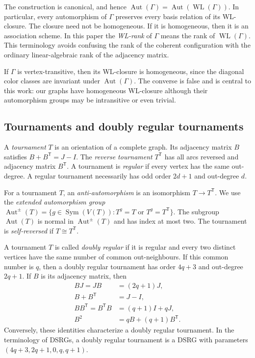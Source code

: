 \documentclass[11pt]{article}
\theoremstyle{definition}
\theoremstyle{remark}
\DeclareMathOperator{\Aut}{Aut}
\begin{document}
The construction is canonical, and hence
$ \Aut(\Gamma)=\Aut(\operatorname{WL}(\Gamma))$.
In particular, every automorphism of $\Gamma$ preserves every basis relation
of its WL-closure.  The closure need not be homogeneous.  If it is
homogeneous, then it is an association scheme.  In this paper the
\emph{WL-rank} of $\Gamma$ means the rank of
$\operatorname{WL}(\Gamma)$.  This terminology avoids confusing the rank of
the coherent configuration with the ordinary linear-algebraic rank of the
adjacency matrix.

If $\Gamma$ is vertex-transitive, then its WL-closure is homogeneous, since
the diagonal color classes are invariant under $\Aut(\Gamma)$.  The converse
is false and is central to this work: our graphs have homogeneous WL-closure
although their automorphism groups may be intransitive or even trivial.

\subsection{Tournaments and doubly regular tournaments}

A \emph{tournament} $T$ is an orientation of a complete graph.  Its adjacency
matrix $B$ satisfies  $B+B^{\mathsf T}=J-I$.
The \emph{reverse tournament} $T^{\mathsf T}$ has all arcs reversed and adjacency
matrix $B^{\mathsf T}$.  A tournament is \emph{regular} if every vertex has
the same out-degree.  A regular tournament necessarily has odd order
$2d+1$ and out-degree $d$.

For a tournament $T$, an \emph{anti-automorphism} is an isomorphism
$T\to T^{\mathsf T}$.  We use the \emph{extended automorphism group}
$ \Aut^{\pm}(T) =\{g\in\operatorname{Sym}(V(T)):
       T^g=T\text{ or }T^g=T^{\mathsf T}\}$.
The subgroup $\Aut(T)$ is normal in $\Aut^{\pm}(T)$ and has index at most
two.  The tournament is \emph{self-reversed} if $T\cong T^{\mathsf T}$.


A tournament $T$ is called \emph{doubly regular}
if it is regular and every two
distinct vertices have the same number of common out-neighbours.
If this common number is $q$, then a doubly regular tournament has order
$4q+3$ and out-degree $2q+1$.  If $B$ is its adjacency matrix, then
\begin{align*}
 BJ=JB&=(2q+1)J, \\
 B+B^{\mathsf T}&=J-I, \\
 BB^{\mathsf T}=B^{\mathsf T}B
   &=(q+1)I+qJ, \\
 B^2&=qB+(q+1)B^{\mathsf T}. 
\end{align*}
Conversely, these identities characterize a doubly regular tournament.  In
the terminology of DSRGs, a doubly regular tournament is a 
DSRG with parameters $(4q+3,2q+1,0,q,q+1)$.
\end{document}
